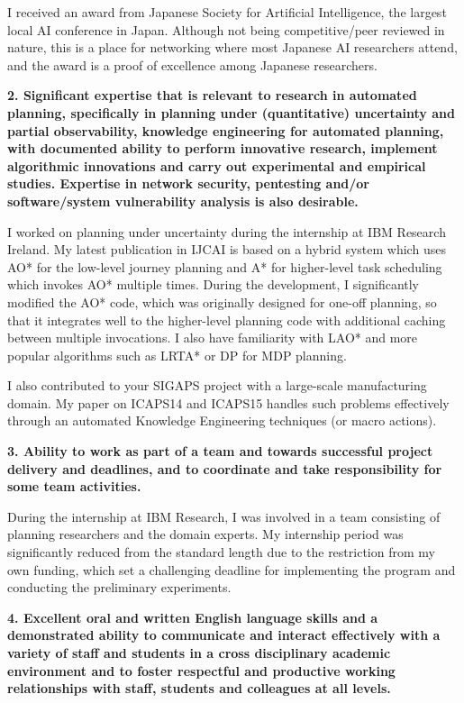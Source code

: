 \documentclass[12pt]{article}
\begin{document}
I received an award from Japanese Society for Artificial Intelligence,
the largest local AI conference in Japan.
Although not being competitive/peer reviewed in nature,
this is a place for networking where most Japanese AI researchers attend,
and the award is a proof of excellence among Japanese researchers.

\vspace{1em}

\textbf{2. Significant expertise that is relevant to research in automated planning, specifically in planning under
(quantitative) uncertainty and partial observability, knowledge engineering for automated planning, with
documented ability to perform innovative research, implement algorithmic innovations and carry out
experimental and empirical studies. Expertise in network security, pentesting and/or software/system
vulnerability analysis is also desirable.}

I worked on planning under uncertainty during the internship at IBM Research Ireland.
My latest publication in IJCAI is based on a hybrid system which uses
AO* for the low-level journey planning and A* for higher-level task scheduling
which invokes AO* multiple times. 
During the development, I significantly modified the AO* code, which was originally designed for one-off planning,
so that it integrates well to the higher-level planning code with additional caching between multiple invocations.
I also have familiarity with LAO* and more popular algorithms such as LRTA* or DP for MDP planning.

I also contributed to your SIGAPS project with a large-scale
manufacturing domain. My paper on ICAPS14 and ICAPS15 handles such
problems effectively through an automated Knowledge Engineering
techniques (or macro actions).

\vspace{1em}

\textbf{3. Ability to work as part of a team and towards successful
project delivery and deadlines, and to coordinate and take
responsibility for some team activities.}

During the internship at IBM Research, I was involved in a team
consisting of planning researchers and the domain experts.
My internship period was significantly reduced from the standard length
due to the restriction from my own funding, which set a challenging deadline
for implementing the program and conducting the preliminary experiments.

\textbf{4. Excellent oral and written English language skills and a
demonstrated ability to communicate and interact effectively with a
variety of staff and students in a cross disciplinary academic
environment and to foster respectful and productive working
relationships with staff, students and colleagues at all levels.}
\end{document}
